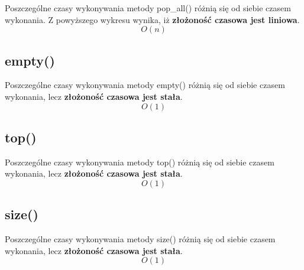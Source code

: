 \documentclass[12pt]{article}
\begin{document}
\begin{multicols}{2}
\begin{figure}[H]
\end{figure}
Poszczególne czasy wykonywania metody pop\_all() różnią się od siebie czasem wykonania. Z powyższego wykresu wynika, iż \textbf{złożoność czasowa jest liniowa}.
\Large{
\begin{equation*}
    O(n)
\end{equation*}}

\subsection{empty()}

\begin{figure}[H]
    \centering
   
    \label{graph: empty}
    
\end{figure}
Poszczególne czasy wykonywania metody empty() różnią się od siebie czasem wykonania, lecz \textbf{złożoność czasowa jest stała}.
\Large{
\begin{equation*}
    O(1)
\end{equation*}}

\subsection{top()}

\begin{figure}[H]
    \centering
    
    \label{graph: top}
    
\end{figure}
Poszczególne czasy wykonywania metody top() różnią się od siebie czasem wykonania, lecz \textbf{złożoność czasowa jest stała}.
\Large{
\begin{equation*}
    O(1)
\end{equation*}}

\subsection{size()}

\begin{figure}[H]
    \centering
    
    \label{graph: size}
    
\end{figure}
Poszczególne czasy wykonywania metody size() różnią się od siebie czasem wykonania, lecz \textbf{złożoność czasowa jest stała}.
\Large{
\begin{equation*}
    O(1)
\end{equation*}}


\end{multicols}
\end{document}
